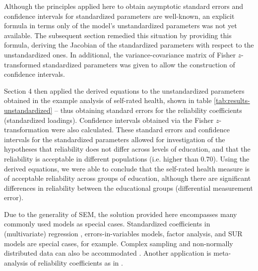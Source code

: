 \documentclass[a4paper,11pt]{article}
\newcommand{\0}{\boldsymbol{0}}
\begin{document}
Although the principles applied here to obtain asymptotic standard errors and confidence intervals for standardized parameters are well-known, 
an explicit formula in terms only of the model's unstandardized parameters was not yet available. The subsequent section remedied this situation by providing this formula, deriving the Jacobian of the standardized parameters with respect to the unstandardized ones. In additional, the 
variance-covariance matrix of Fisher $z$-transformed standardized parameters was given to allow the construction of confidence intervals.

Section 4 then applied the derived equations to the unstandardized parameters obtained in the example analysis of self-rated health, shown in table \ref{tab:results-unstandardized} -- thus obtaining standard errors for the reliability coefficients (standardized loadings). Confidence intervals obtained via the Fisher $z$-transformation were also calculated. These standard errors and confidence intervals for the standardized parameters allowed for 
investigation of the hypotheses that reliability does not differ across levels of education, and that the reliability is acceptable in 
different populations (i.e. higher than 0.70). Using the derived equations, we were able to conclude that the self-rated health measure
is of acceptable reliability across groups of education, although there are significant differences in reliability between the educational groups (differential measurement error).


\vspace{12pt}
Due to the generality of SEM, the solution provided here encompasses many commonly used models as special cases. Standardized
coefficients in (multivariate) regression \citep[discussed in ][121]{bollen1990direct}, 
errors-in-variables models, factor analysis, and SUR models are special cases, for example. 
Complex sampling and non-normally distributed data can also be accommodated  \citep{muthen1995complex}. Another  application is meta-analysis of reliability coefficients as in \cite{andrews_construct_1984,scherpenzeel_validity_1997,saris_estimation_2007,alwin_margins_2007}.
\end{document}
